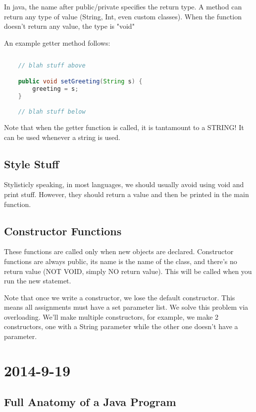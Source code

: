 \documentclass [12 pt, twoside] {article}
\begin{document}
In java, the name after public/private specifies the return type.
A method can return any type of value (String, Int, even custom classes).
When the function doesn't return any value, the type is "void"


An example getter method follows:
\begin{lstlisting}[language=java]
	
	// blah stuff above

	public void setGreeting(String s) {
		greeting = s;
	}

	// blah stuff below
\end{lstlisting}


Note that when the getter function is called, it is tantamount to a STRING!
It can be used whenever a string is used.


\subsection{Style Stuff}


Stylisticly speaking, in most languages, we should usually avoid using void and print stuff.
However, they should return a value and then be printed in the main function.


\subsection{Constructor Functions}


These functions are called only when new objects are declared.
Constructor functions are always public, its name is the name of the class, and there's no return value (NOT VOID, simply NO return value).
This will be called when you run the new statemet.


Note that once we write a constructor, we lose the default constructor.
This means all assignments must have a set parameter list.
We solve this problem via overloading.
We'll make multiple constructors, for example, we make 2 constructors, one with a String parameter while the other one doesn't have a parameter.


\section{2014-9-19}
\subsection{Full Anatomy of a Java Program}
\end{document}
